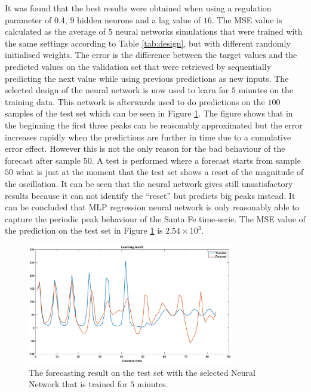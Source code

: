 \documentclass[a4paper,10pt]{article}
\begin{document}
It was found that the best results were obtained when using a regulation parameter of $ 0.4 $, $ 9 $ hidden neurons and a lag value of $ 16 $. The MSE value is calculated as the average of $ 5 $ neural networks simulations that were trained with the same settings according to Table \ref{tab:design}, but with different randomly initialised weights. The error is the difference between the target values and the predicted values on the validation set that were retrieved by sequentially predicting the next value while using previous predictions as new inputs. The selected design of the neural network is now used to learn for $ 5 $ minutes on the training data. This network is afterwards used to do predictions on the $ 100 $ samples of the test set which can be seen in Figure \ref{fig:After_simulation_of_5min_per}. The figure shows that in the beginning the first three peaks can be reasonably approximated but the error increases rapidly when the predictions are further in time due to a cumulative error effect. However this is not the only reason for the bad behaviour of the forecast after sample $ 50 $. A test is performed where a forecast starts from sample $ 50 $ what is just at the moment that the test set shows a reset of the magnitude of the oscillation. It can be seen that the neural network gives still unsatisfactory results because it can not identify the ``reset'' but predicts big peaks instead. It can be concluded that MLP regression neural network is only reasonably able to capture the periodic peak behaviour of the Santa Fe time-serie. The MSE value of the prediction on the test set in Figure \ref{fig:After_simulation_of_5min_per} is $ 2.54\times10^{3} $.

\begin{figure}[h!]
	\centering
	\includegraphics[width=0.8\textwidth]{learning_result.png}
	\caption{The forecasting result on the test set with the selected Neural Network that is trained for $ 5 $ minutes.}
	\label{fig:After_simulation_of_5min_per}
\end{figure}
\end{document}
